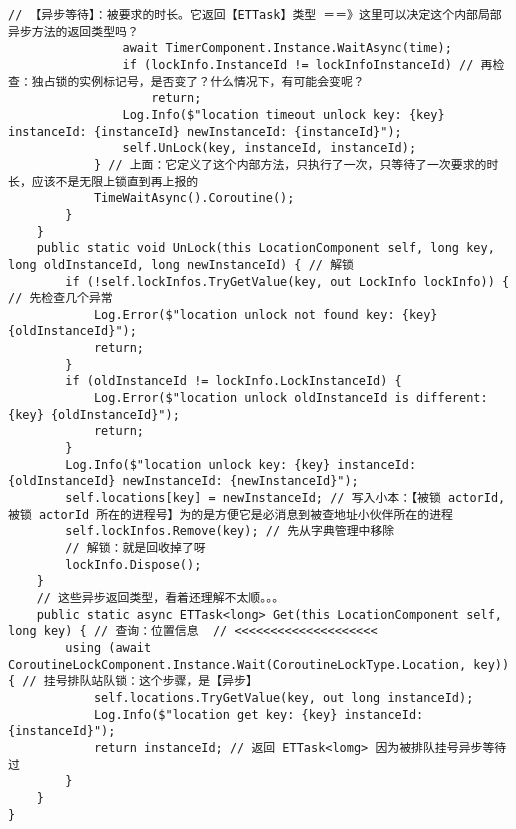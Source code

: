 \documentclass[9pt, b5paper]{article}
\begin{document}
\begin{verbatim}
// 【异步等待】：被要求的时长。它返回【ETTask】类型 ＝＝》这里可以决定这个内部局部异步方法的返回类型吗？
                await TimerComponent.Instance.WaitAsync(time); 
                if (lockInfo.InstanceId != lockInfoInstanceId) // 再检查：独占锁的实例标记号，是否变了？什么情况下，有可能会变呢？
                    return;
                Log.Info($"location timeout unlock key: {key} instanceId: {instanceId} newInstanceId: {instanceId}");
                self.UnLock(key, instanceId, instanceId);
            } // 上面：它定义了这个内部方法，只执行了一次，只等待了一次要求的时长，应该不是无限上锁直到再上报的
            TimeWaitAsync().Coroutine();
        }
    }
    public static void UnLock(this LocationComponent self, long key, long oldInstanceId, long newInstanceId) { // 解锁
        if (!self.lockInfos.TryGetValue(key, out LockInfo lockInfo)) { // 先检查几个异常
            Log.Error($"location unlock not found key: {key} {oldInstanceId}");
            return;
        }
        if (oldInstanceId != lockInfo.LockInstanceId) {
            Log.Error($"location unlock oldInstanceId is different: {key} {oldInstanceId}");
            return;
        }
        Log.Info($"location unlock key: {key} instanceId: {oldInstanceId} newInstanceId: {newInstanceId}");
        self.locations[key] = newInstanceId; // 写入小本：【被锁 actorId, 被锁 actorId 所在的进程号】为的是方便它是必消息到被查地址小伙伴所在的进程
        self.lockInfos.Remove(key); // 先从字典管理中移除 
        // 解锁：就是回收掉了呀
        lockInfo.Dispose();
    }
    // 这些异步返回类型，看着还理解不太顺。。。
    public static async ETTask<long> Get(this LocationComponent self, long key) { // 查询：位置信息  // <<<<<<<<<<<<<<<<<<<< 
        using (await CoroutineLockComponent.Instance.Wait(CoroutineLockType.Location, key)) { // 挂号排队站队锁：这个步骤，是【异步】
            self.locations.TryGetValue(key, out long instanceId);
            Log.Info($"location get key: {key} instanceId: {instanceId}");
            return instanceId; // 返回 ETTask<lomg> 因为被排队挂号异步等待过
        }
    }
}
\end{verbatim}
\end{document}
